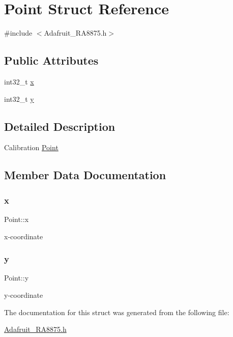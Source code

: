 \hypertarget{struct_point}{}\section{Point Struct Reference}
\label{struct_point}


{\ttfamily \#include $<$Adafruit\+\_\+\+R\+A8875.\+h$>$}

\subsection*{Public Attributes}
\begin{DoxyCompactItemize}
\item 
int32\+\_\+t \mbox{\hyperlink{struct_point_af097a9674d34f08e0442d41b5325c4ff}{x}}
\item 
int32\+\_\+t \mbox{\hyperlink{struct_point_a42fa09d358e1b4bde686eb68f6664c3f}{y}}
\end{DoxyCompactItemize}


\subsection{Detailed Description}
Calibration \mbox{\hyperlink{struct_point}{Point}} 

\subsection{Member Data Documentation}
\mbox{\label{struct_point_af097a9674d34f08e0442d41b5325c4ff}} 
\subsubsection{\texorpdfstring{x}{x}}
{\footnotesize\ttfamily Point\+::x}

x-\/coordinate \mbox{\label{struct_point_a42fa09d358e1b4bde686eb68f6664c3f}} 
\subsubsection{\texorpdfstring{y}{y}}
{\footnotesize\ttfamily Point\+::y}

y-\/coordinate 

The documentation for this struct was generated from the following file\+:\begin{DoxyCompactItemize}
\item 
\mbox{\hyperlink{_adafruit___r_a8875_8h}{Adafruit\+\_\+\+R\+A8875.\+h}}\end{DoxyCompactItemize}

